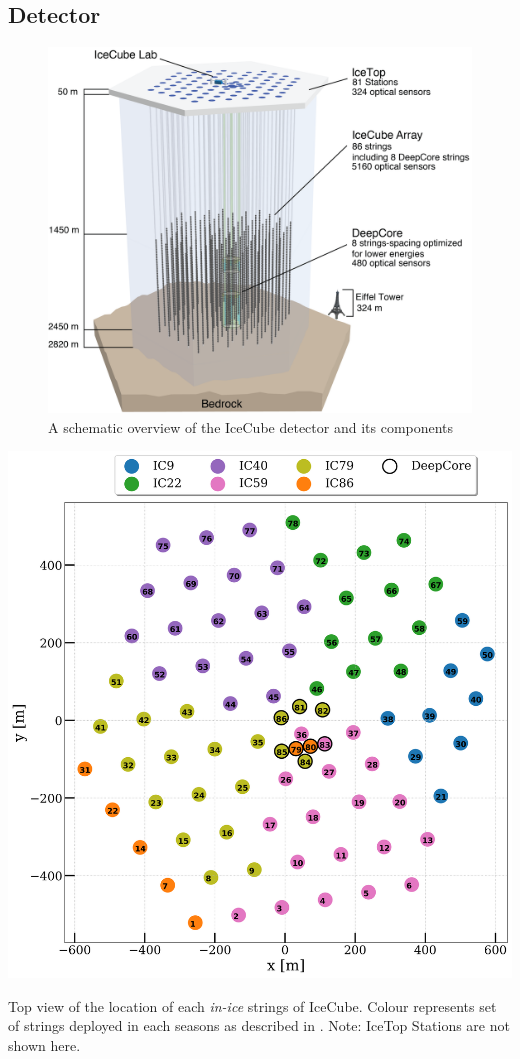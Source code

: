 \subsection{Detector}
\label{sec:IC_coordinate}
\begin{figure}
	\centering \includegraphics{./figures/nu_in_icecube/IceCubeArray_slim.png}
	\caption{A schematic overview of the IceCube detector and its components \cite{Aartsen_2017}}
\end{figure}
    
\begin{marginfigure}
	\includegraphics{./figures/nu_in_icecube/IC_Phase_Array.png}
	\caption{Top view of the location of each \emph{in-ice} strings of IceCube. Colour represents set of strings deployed in each seasons as described in . Note: IceTop Stations are not shown here.}
\end{marginfigure}


